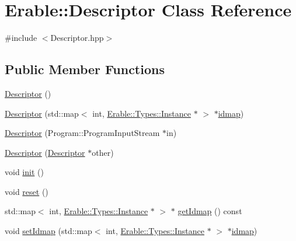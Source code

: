 \hypertarget{class_erable_1_1_descriptor}{}\section{Erable\+::Descriptor Class Reference}
\label{class_erable_1_1_descriptor}


{\ttfamily \#include $<$Descriptor.\+hpp$>$}

\subsection*{Public Member Functions}
\begin{DoxyCompactItemize}
\item 
\mbox{\hyperlink{class_erable_1_1_descriptor_a96b4e123aafc08c8dbaeccb4375e6451}{Descriptor}} ()
\item 
\mbox{\hyperlink{class_erable_1_1_descriptor_a9f082b3752be4d595a1a842de14c004d}{Descriptor}} (std\+::map$<$ int, \mbox{\hyperlink{class_erable_1_1_erable_1_1_types_1_1_instance}{Erable\+::\+Types\+::\+Instance}} $\ast$ $>$ $\ast$\mbox{\hyperlink{class_erable_1_1_descriptor_a10946ca25cb512e8a4c765c517509c7f}{idmap}})
\item 
\mbox{\hyperlink{class_erable_1_1_descriptor_ab178a09ab8bbae9e5693dfc8bb7ae948}{Descriptor}} (Program\+::\+Program\+Input\+Stream $\ast$in)
\item 
\mbox{\hyperlink{class_erable_1_1_descriptor_a189b746040601d4c605d7d9a778223d2}{Descriptor}} (\mbox{\hyperlink{class_erable_1_1_descriptor}{Descriptor}} $\ast$other)
\item 
void \mbox{\hyperlink{class_erable_1_1_descriptor_a069b8d3315849b50e2f094f90489252b}{init}} ()
\item 
void \mbox{\hyperlink{class_erable_1_1_descriptor_adf3369bced93494459b4b21cf7c1cab1}{reset}} ()
\item 
std\+::map$<$ int, \mbox{\hyperlink{class_erable_1_1_erable_1_1_types_1_1_instance}{Erable\+::\+Types\+::\+Instance}} $\ast$ $>$ $\ast$ \mbox{\hyperlink{class_erable_1_1_descriptor_a990fc70e63da77dab5efc550149cc6af}{get\+Idmap}} () const
\item 
void \mbox{\hyperlink{class_erable_1_1_descriptor_ac9fc4917b73d37dd28c3ed465ee77f67}{set\+Idmap}} (std\+::map$<$ int, \mbox{\hyperlink{class_erable_1_1_erable_1_1_types_1_1_instance}{Erable\+::\+Types\+::\+Instance}} $\ast$ $>$ $\ast$\mbox{\hyperlink{class_erable_1_1_descriptor_a10946ca25cb512e8a4c765c517509c7f}{idmap}})
\item 

\end{DoxyCompactItemize}
